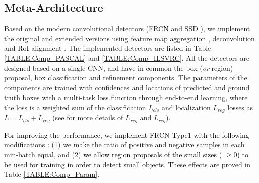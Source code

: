 \documentclass[10pt,twocolumn,letterpaper]{article}
\newcommand{\RE}{\textcolor{black}}
\newcommand{\RV}{\textcolor{black}}
\begin{document}
\subsection{Meta-Architecture}
\label{Sec:Meta}
Based on the modern convolutional detectors (\RE{FRCN} \cite{RenHGS15_NIPS15} and SSD \cite{LiuAESRFB_ECCV16}), we implement the original and extended versions using  feature map \RV{aggregation} \cite{KongYCS_CVPR16}, deconvolution \cite{FuLRTB_Corr17} and \RV{RoI} alignment \cite{HeGDG_CORR17}. The implemented detectors are \RE{listed} in Table \ref{TABLE:Comp_PASCAL} and \ref{TABLE:Comp_ILSVRC}.
%
%
All the detectors are designed based on a single CNN, and have in common the box (\textit{or} region) proposal, box classification and refinement components. 
%
The parameters of the components are trained with confidences and locations of predicted and ground truth boxes with a multi-task loss function through end-to-end learning, where the loss is a weighted sum of the classification $L_{cls}$ and localization $L_{reg}$ \RV{losses}  as $L =L_{cls}+ L_{reg} $ (see \cite{Girshick15_ICCV15} for more details of $L_{reg}$ and $L_{reg}$). 



\RE{For improving the performance, we implement FRCN-Type1 with the following modifications }: (1) we make the ratio of positive and negative samples in each min-batch \RE{equal}, and 
(2) \RV{we allow region proposals of the small sizes ( $\geq 0$) to be used for training in order to detect small objects}. These effects are proved in Table \ref{TABLE:Comp_Param}.

\end{document}
